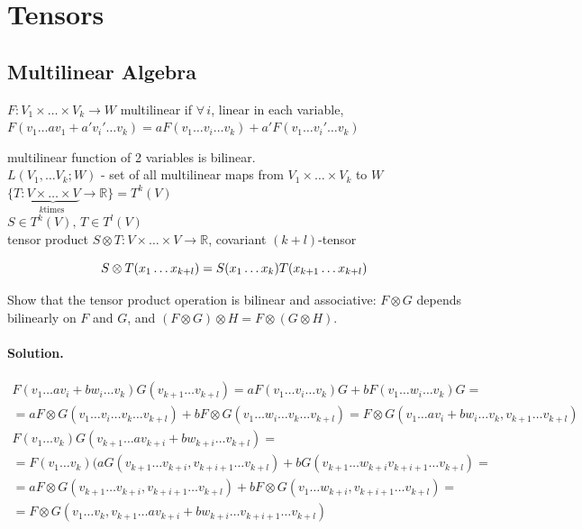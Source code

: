 \section{Tensors}



\subsection*{ Multilinear Algebra }



$F: V_1 \times \dots \times V_k \to W$ multilinear if $\forall \, i$, linear in each variable, $F(v_1 \dots a v_1 + a' v_i' \dots v_k) = aF(v_1 \dots v_i \dots v_k) + a'F(v_1 \dots v_i' \dots v_k)$

multilinear function of 2 variables is bilinear.  \\

$L(V_1, \dots V_k; W)$ - set of all multilinear maps from $V_1 \times \dots \times V_k$ to $W$ \\

$\lbrace T: \underbrace{V\times \dots \times V}_{k \text{times }} \to \mathbb{R} \rbrace = T^k(V)$  \\

$S\in T^k(V), \, T\in T^l(V)$  \\
tensor product $S\otimes T: V \times \dots \times V \to \mathbb{R}$, covariant $(k+l)$-tensor

\[
  S \otimes T(x_1 \dots x_{k+l}) = S(x_1 \dots x_k) T(x_{k+1} \dots x_{k+l}) \\ 
\]

\begin{exercise}
Show that the tensor product operation is bilinear and associative: $F\otimes G$ depends bilinearly on $F$ and $G$, and $(F\otimes G)\otimes H=F\otimes(G\otimes H)$.
\end{exercise}
\paragraph{Solution.}  
\[
\begin{gathered}
  F(v_1 \dots av_i + bw_i \dots v_k) G(v_{k+1} \dots v_{k+l}) = aF(v_1 \dots v_i \dots v_k) G + b F(v_1 \dots w_i \dots v_k)G = \\
  =  aF\otimes G(v_1 \dots v_i \dots v_k \dots v_{k+l}) + bF\otimes G(v_1 \dots w_i \dots v_k \dots v_{k+l}) = F\otimes G( v_1 \dots a v_i  + b w_i \dots v_k, v_{k+1} \dots v_{k+l} ) \\ 
    F(v_1 \dots v_k) G(v_{k+1} \dots av_{k+i} + bw_{k+i} \dots v_{k+l}) = \\
    = F(v_1 \dots v_k)(aG(v_{k+1} \dots v_{k+i}, v_{k+i +1} \dots v_{k+l} ) + bG(v_{k+1 } \dots w_{k+i} v_{k+i +1} \dots v_{k+l }) = \\ 
    = aF\otimes G(v_{k+1} \dots v_{k+i} , v_{k+i +1} \dots v_{k+l }) + bF\otimes G(v_1 \dots w_{k+i}, v_{k+i + 1} \dots v_{k+l} ) = \\
    = F\otimes G(v_1 \dots v_k, v_{k+1} \dots av_{k+i} + b w_{k+i} \dots v_{k+i +1} \dots v_{k+l })
\end{gathered}
\]

